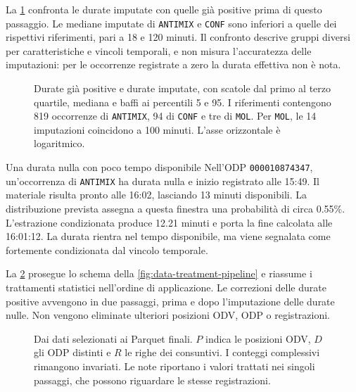 

La \cref{fig:zero-duration-distributions} confronta le durate imputate con quelle già positive prima di questo passaggio. Le mediane imputate di \texttt{ANTIMIX} e \texttt{CONF} sono inferiori a quelle dei rispettivi riferimenti, pari a 18 e 120 minuti. Il confronto descrive gruppi diversi per caratteristiche e vincoli temporali, e non misura l'accuratezza delle imputazioni: per le occorrenze registrate a zero la durata effettiva non è nota.

\begin{figure}[htbp]
\centering
{}
\caption{Durate già positive e durate imputate, con scatole dal primo al terzo quartile, mediana e baffi ai percentili 5 e 95. I riferimenti contengono 819 occorrenze di \texttt{ANTIMIX}, 94 di \texttt{CONF} e tre di \texttt{MOL}. Per \texttt{MOL}, le 14 imputazioni coincidono a 100 minuti. L'asse orizzontale è logaritmico.}
\label{fig:zero-duration-distributions}
\end{figure}

\begingroup
{}
\begin{examplebox}{Una durata nulla con poco tempo disponibile}
Nell'ODP \texttt{000010874347}, un'occorrenza di \texttt{ANTIMIX} ha durata nulla e inizio registrato alle 15:49. Il materiale risulta pronto alle 16:02, lasciando 13 minuti disponibili. La distribuzione prevista assegna a questa finestra una probabilità di circa \num{0.55}\%. L'estrazione condizionata produce \num{12.21} minuti e porta la fine calcolata alle 16:01:12. La durata rientra nel tempo disponibile, ma viene segnalata come fortemente condizionata dal vincolo temporale.
\end{examplebox}
\endgroup

La \cref{fig:statistical-treatment-pipeline} prosegue lo schema della \cref{fig:data-treatment-pipeline} e riassume i trattamenti statistici nell'ordine di applicazione. Le correzioni delle durate positive avvengono in due passaggi, prima e dopo l'imputazione delle durate nulle. Non vengono eliminate ulteriori posizioni ODV, ODP o registrazioni.

\begin{figure}[htbp]
\centering
\reportfigurecontent{}
\caption{Dai dati selezionati ai Parquet finali. $P$ indica le posizioni ODV, $D$ gli ODP distinti e $R$ le righe dei consuntivi. I conteggi complessivi rimangono invariati. Le note riportano i valori trattati nei singoli passaggi, che possono riguardare le stesse registrazioni.}
\label{fig:statistical-treatment-pipeline}
\end{figure}
